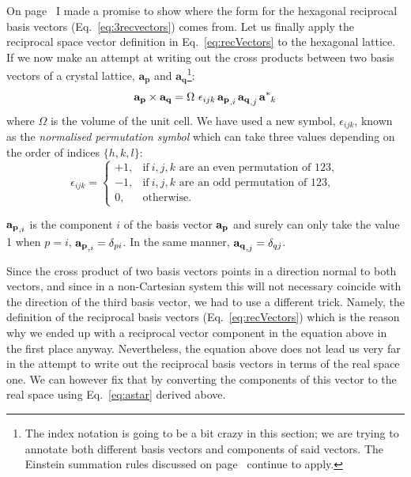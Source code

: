 On page~\pageref{eq:3recvectors} I made a promise to show where the form for the hexagonal reciprocal basis vectors (Eq.~\ref{eq:3recvectors}) comes from.
Let us finally apply the reciprocal space vector definition in Eq.~\ref{eq:recVectors} to the hexagonal lattice. If we now make an attempt at writing out the cross products between two basis vectors of a crystal lattice, $\mathbf{a_p}$ and $\mathbf{a_q}$\footnote{ The index notation is going to be a bit crazy in this section; we are trying to annotate both different basis vectors and components of said vectors. The Einstein summation rules discussed on page~\pageref{par:Einstein} continue to apply.}:
\begin{equation*}
\vb{a_p} \times \vb{a_q} = \Omega \,\, \epsilon_{ijk} \, \vb{a_p}_{,i}\,  \vb{a_q}_{,j} \,   \vb{a^*}_k
\end{equation*} 
where $\Omega$ is the volume of the unit cell. We have used a new symbol, $\epsilon_{ijk}$, known as the \textit{normalised permutation symbol} which can take three values depending on the order of indices $\{h, k, l\}$: 
\begin{equation*}
\epsilon_{ijk}=
    \begin{cases}
      +1, & \text{if}\ {i,j,k} \text{ are an even permutation of 123}, \\
      -1, & \text{if}\ {i,j,k} \text{ are an odd permutation of 123},\\
      0, & \text{otherwise} .
    \end{cases}
\end{equation*}

$\vb{a_p}_{,i}$ is the component $i$ of the basis vector $\vb{a_p}$ and surely can only take the value 1 when $p=i$, \ie $\vb{a_p}_{,i}=\delta_{pi}$. In the same manner,  $\vb{a_q}_{,j}=\delta_{qj}$.

Since the cross product of two basis vectors points in a direction normal to both vectors, and since in a non-Cartesian system this will not necessary coincide with the direction of the third basis vector, we had to use a different trick. Namely, the definition of the reciprocal basis vectors (Eq.~\ref{eq:recVectors}) which is the reason why we ended up with a reciprocal vector component in the equation above in the first place anyway. Nevertheless, the equation above does not lead us very far in the attempt to write out the reciprocal basis vectors in terms of the real space one. We can however fix that by converting the components of this vector to the real space using Eq.~\ref{eq:astar} derived above. 

